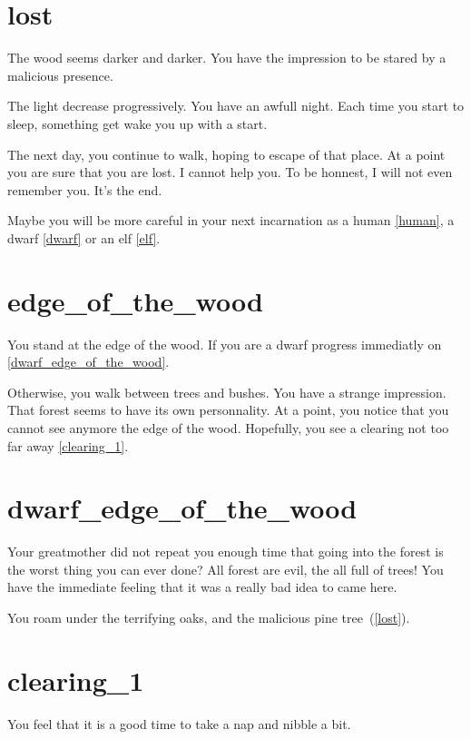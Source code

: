 \section{lost}

The wood seems darker and darker. You have the impression to be stared by a
malicious presence.

The light decrease progressively. You have an awfull night. Each time you start
to sleep, something get wake you up with a start.

The next day, you continue to walk, hoping to escape of that place. At a point
you are sure that you are lost. I cannot help you. To be honnest, I will not
even remember you. It's the end.

\medbreak

Maybe you will be more careful in your next incarnation as a human \ref{human}, a dwarf \ref{dwarf} or an
elf \ref{elf}.

\section{edge_of_the_wood}

You stand at the edge of the wood. If you are a dwarf progress immediatly on
\ref{dwarf_edge_of_the_wood}.

Otherwise, you walk between trees and bushes. You have a strange impression.
That forest seems to have its own personnality. At a point, you notice that you
cannot see anymore the edge of the wood. Hopefully, you see a clearing not too
far away \ref{clearing_1}.

\section{dwarf_edge_of_the_wood}

Your greatmother did not repeat you enough time that going into the forest is
the worst thing you can ever done? All forest are evil, the all full of trees!
You have the immediate feeling that it was a really bad idea to came here.

You roam under the terrifying oaks, and the malicious pine tree~(\ref{lost}).

\section{clearing_1}

You feel that it is a good time to take a nap and nibble a bit.

